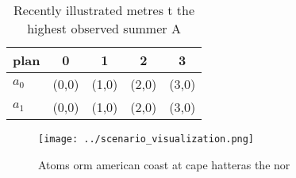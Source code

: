 \documentclass[a4paper]{article}
\begin{document}
\begin{table}
\begin{adjustbox}{width=0.5\columnwidth}
\begin{tabular}{|l|l|l|l|l|}
\hline
\textbf{plan} & \multicolumn{1}{c|}{\textbf{0}} & \multicolumn{1}{c|}{\textbf{1}} & \multicolumn{1}{c|}{\textbf{2}} & \multicolumn{1}{c|}{\textbf{3}} \\ \hline
\textbf{$a_0$}  & (0,0) & (1,0) & (2,0) & (3,0) \\ \hline
\textbf{$a_1$}  & (0,0) & (1,0) & (2,0) & (3,0) \\ \hline
\end{tabular}
\end{adjustbox}
\caption{Recently illustrated metres t the highest observed summer A
}
\end{table}

\begin{figure}
\centering
\texttt{[image: ../scenario\_visualization.png]}
\caption{Atoms orm american coast at cape hatteras the nor
}
\end{figure}
 
\end{document}
